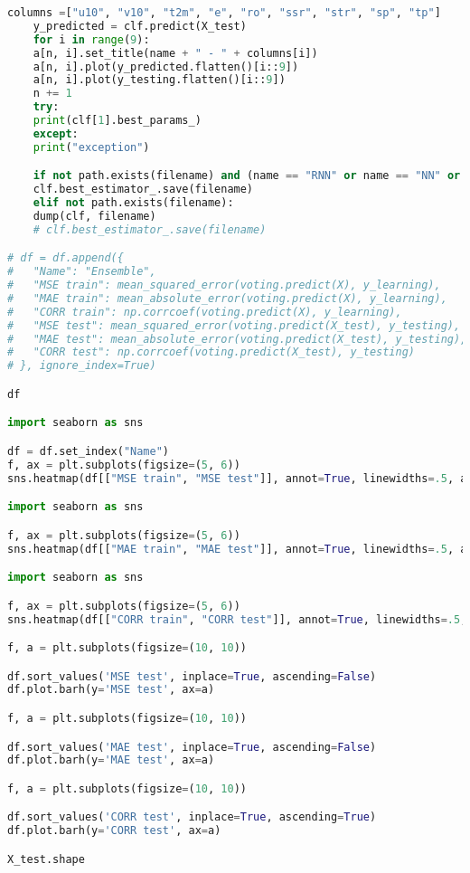\begin{lstlisting}[label=python-listing,caption={Kod źródłowy},language=python]
    columns =["u10", "v10", "t2m", "e", "ro", "ssr", "str", "sp", "tp"]
    y_predicted = clf.predict(X_test)
    for i in range(9):
    a[n, i].set_title(name + " - " + columns[i])
    a[n, i].plot(y_predicted.flatten()[i::9])
    a[n, i].plot(y_testing.flatten()[i::9])
    n += 1
    try:
    print(clf[1].best_params_)
    except:
    print("exception")

    if not path.exists(filename) and (name == "RNN" or name == "NN" or name == "CNN"):
    clf.best_estimator_.save(filename)
    elif not path.exists(filename):
    dump(clf, filename)
    # clf.best_estimator_.save(filename)

# df = df.append({
#   "Name": "Ensemble",
#   "MSE train": mean_squared_error(voting.predict(X), y_learning),
#   "MAE train": mean_absolute_error(voting.predict(X), y_learning),
#   "CORR train": np.corrcoef(voting.predict(X), y_learning),
#   "MSE test": mean_squared_error(voting.predict(X_test), y_testing),
#   "MAE test": mean_absolute_error(voting.predict(X_test), y_testing),
#   "CORR test": np.corrcoef(voting.predict(X_test), y_testing)
# }, ignore_index=True)

df

import seaborn as sns

df = df.set_index("Name")
f, ax = plt.subplots(figsize=(5, 6))
sns.heatmap(df[["MSE train", "MSE test"]], annot=True, linewidths=.5, ax=ax, cmap="Blues")

import seaborn as sns

f, ax = plt.subplots(figsize=(5, 6))
sns.heatmap(df[["MAE train", "MAE test"]], annot=True, linewidths=.5, ax=ax, cmap="Blues")

import seaborn as sns

f, ax = plt.subplots(figsize=(5, 6))
sns.heatmap(df[["CORR train", "CORR test"]], annot=True, linewidths=.5, ax=ax, cmap="Blues")

f, a = plt.subplots(figsize=(10, 10))

df.sort_values('MSE test', inplace=True, ascending=False)
df.plot.barh(y='MSE test', ax=a)

f, a = plt.subplots(figsize=(10, 10))

df.sort_values('MAE test', inplace=True, ascending=False)
df.plot.barh(y='MAE test', ax=a)

f, a = plt.subplots(figsize=(10, 10))

df.sort_values('CORR test', inplace=True, ascending=True)
df.plot.barh(y='CORR test', ax=a)

X_test.shape


\end{lstlisting}

